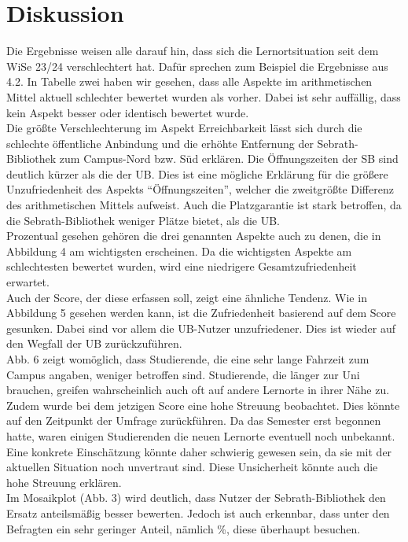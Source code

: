 \documentclass[11pt, a4paper]{article}
\begin{document}
\section{Diskussion}
Die Ergebnisse weisen alle darauf hin, dass sich die Lernortsituation seit dem WiSe 23/24 verschlechtert hat. Dafür sprechen zum Beispiel die Ergebnisse aus 4.2. In Tabelle zwei haben wir gesehen, dass alle Aspekte im arithmetischen Mittel aktuell schlechter bewertet wurden als vorher. Dabei ist sehr auffällig, dass kein Aspekt besser oder identisch bewertet wurde.\\
Die größte Verschlechterung im Aspekt Erreichbarkeit lässt sich durch die schlechte öffentliche Anbindung und die erhöhte Entfernung der Sebrath-Bibliothek zum Campus-Nord bzw. Süd erklären.  Die Öffnungszeiten der SB sind deutlich kürzer als die der UB. Dies ist eine mögliche Erklärung für die größere Unzufriedenheit des Aspekts “Öffnungszeiten”, welcher die zweitgrößte Differenz des arithmetischen Mittels aufweist. Auch die Platzgarantie ist stark betroffen, da die Sebrath-Bibliothek weniger Plätze bietet, als die UB. \\
Prozentual gesehen gehören die drei genannten Aspekte auch zu denen, die in Abbildung 4 am wichtigsten erscheinen. Da die wichtigsten Aspekte am schlechtesten bewertet wurden, wird eine niedrigere Gesamtzufriedenheit erwartet.\\
Auch der Score, der diese erfassen soll, zeigt eine ähnliche Tendenz. Wie in Abbildung 5 gesehen werden kann, ist die Zufriedenheit basierend auf dem Score gesunken.
Dabei sind vor allem die UB-Nutzer unzufriedener. Dies ist wieder auf den Wegfall der UB zurückzuführen.\\

Abb. 6 zeigt womöglich, dass Studierende, die eine sehr lange Fahrzeit zum Campus angaben, weniger betroffen sind. Studierende, die länger zur Uni brauchen, greifen wahrscheinlich auch oft auf andere Lernorte in ihrer Nähe zu. \\

Zudem wurde bei dem jetzigen Score eine hohe Streuung beobachtet. Dies könnte auf den Zeitpunkt der Umfrage zurückführen. Da das Semester erst begonnen hatte, waren einigen Studierenden die neuen Lernorte eventuell noch unbekannt. Eine konkrete Einschätzung könnte daher schwierig gewesen sein, da sie mit der aktuellen Situation noch unvertraut sind. Diese Unsicherheit könnte auch die hohe Streuung erklären.\\

Im Mosaikplot (Abb. 3) wird deutlich, dass Nutzer der Sebrath-Bibliothek den Ersatz anteilsmäßig besser bewerten. Jedoch ist auch erkennbar, dass unter den Befragten ein sehr geringer Anteil, nämlich \%, diese überhaupt besuchen.\\
\end{document}
